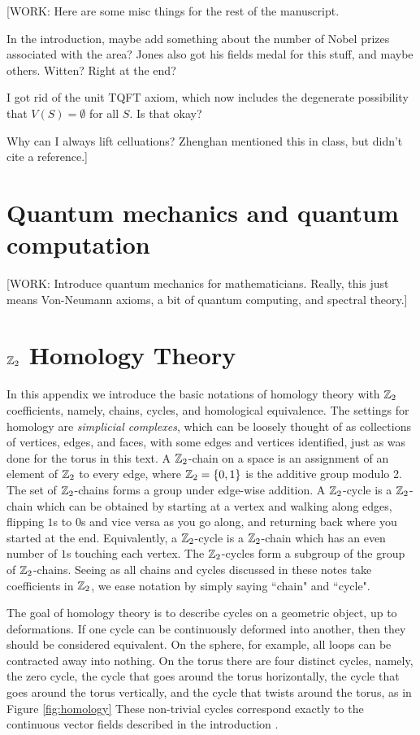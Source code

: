 \documentclass{article}
\theoremstyle{definition}
\numberwithin{figure}{section}
\begin{document}
[WORK: Here are some misc things for the rest of the manuscript.

In the introduction, maybe add something about the number of Nobel prizes associated with the area? Jones also got his fields medal for this stuff, and maybe others. Witten? Right at the end?

I got rid of the unit TQFT axiom, which now includes the degenerate possibility that $V(S)=\emptyset$ for all $S$. Is that okay?

Why can I always lift celluations? Zhenghan mentioned this in class, but didn't cite a reference.]
\appendix

\section{Quantum mechanics and quantum computation}
\label{Quantum mechanics}

[WORK: Introduce quantum mechanics for mathematicians. Really, this just means Von-Neumann axioms, a bit of quantum computing, and spectral theory.]

\section{$\mathbb{Z}_2$ Homology Theory}
\label{Homology}

In this appendix we introduce the basic notations of homology theory with $\mathbb{Z}_2$ coefficients, namely, chains, cycles, and homological equivalence. The settings for homology are \textit{simplicial complexes}, which can be loosely thought of as collections of vertices, edges, and faces, with some edges and vertices identified, just as was done for the torus in this text. A $\mathbb{Z}_2$-chain on a space is an assignment of an element of $\mathbb{Z}_2$ to every edge, where $\mathbb{Z}_2=\{0,1\}$ is the additive group modulo 2. The set of $\mathbb{Z}_2$-chains forms a group under edge-wise addition. A $\mathbb{Z}_2$-cycle is a $\mathbb{Z}_2$-chain which can be obtained by starting at a vertex and walking along edges, flipping $1$s to $0$s and vice versa as you go along, and returning back where you started at the end. Equivalently, a $\mathbb{Z}_2$-cycle is a $\mathbb{Z}_2$-chain which has an even number of $1$s touching each vertex. The $\mathbb{Z}_2$-cycles form a subgroup of the group of $\mathbb{Z}_2$-chains. Seeing as all chains and cycles discussed in these notes take coefficients in $\mathbb{Z}_2$, we ease notation by simply saying ``chain" and ``cycle".

The goal of homology theory is to describe cycles on a geometric object, up to deformations. If one cycle can be continuously deformed into another, then they should be considered equivalent. On the sphere, for example, all loops can be contracted away into nothing. On the torus there are four distinct cycles, namely, the zero cycle, the cycle that goes around the torus horizontally, the cycle that goes around the torus vertically, and the cycle that twists around the torus, as in Figure \ref{fig:homology} These non-trivial cycles correspond exactly to the continuous vector fields described in the introduction \cite{frankel1957homology}.
\end{document}
